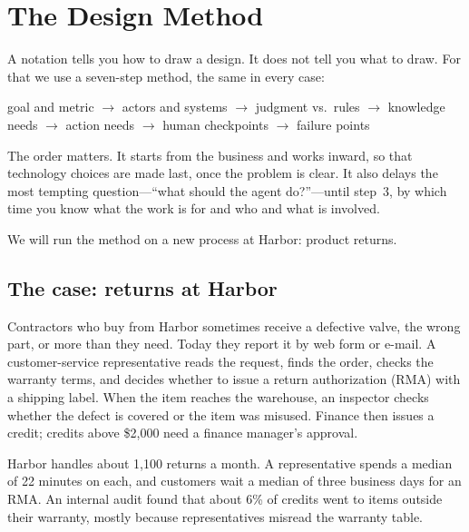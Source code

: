 
\section{The Design Method}
\label{sec:method}

A notation tells you how to draw a design. It does not tell you what to draw. For that we use a seven-step method, the same in every case:

\begin{center}
\small
goal and metric $\rightarrow$ actors and systems $\rightarrow$ judgment vs.\ rules $\rightarrow$ knowledge needs $\rightarrow$ action needs $\rightarrow$ human checkpoints $\rightarrow$ failure points
\end{center}

The order matters. It starts from the business and works inward, so that technology choices are made last, once the problem is clear. It also delays the most tempting question---``what should the agent do?''---until step~3, by which time you know what the work is for and who and what is involved.

We will run the method on a new process at Harbor: product returns.

\subsection{The case: returns at Harbor}

Contractors who buy from Harbor sometimes receive a defective valve, the wrong part, or more than they need. Today they report it by web form or e-mail. A customer-service representative reads the request, finds the order, checks the warranty terms, and decides whether to issue a return authorization (RMA) with a shipping label. When the item reaches the warehouse, an inspector checks whether the defect is covered or the item was misused. Finance then issues a credit; credits above \$2{,}000 need a finance manager's approval.

Harbor handles about 1{,}100 returns a month. A representative spends a median of 22 minutes on each, and customers wait a median of three business days for an RMA. An internal audit found that about 6\% of credits went to items outside their warranty, mostly because representatives misread the warranty table.

